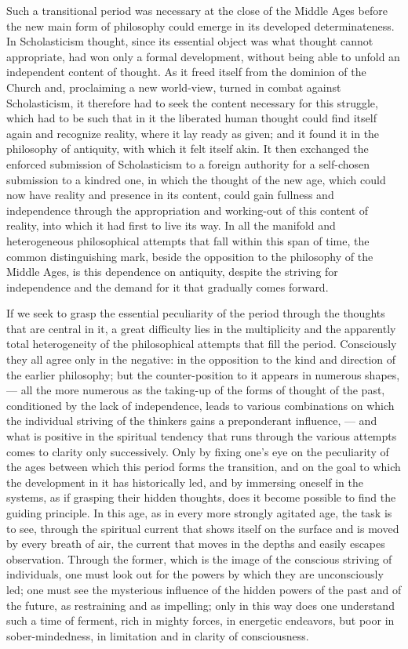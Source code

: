 Such a transitional period was necessary at the close of the Middle
Ages before the new main form of philosophy could emerge in its
developed determinateness. In Scholasticism thought, since its
essential object was what thought cannot appropriate, had won only a
formal development, without being able to unfold an independent
content of thought. As it freed itself from the dominion of the Church
and, proclaiming a new world-view, turned in combat against
Scholasticism, it therefore had to seek the content necessary for this
struggle, which had to be such that in it the liberated human thought
could find itself again and recognize reality, where it lay ready as
given; and it found it in the philosophy of antiquity, with which it
felt itself akin. It then exchanged the enforced submission of
Scholasticism to a foreign authority for a self-chosen submission to a
kindred one, in which the thought of the new age, which could now have
reality and presence in its content, could gain fullness and
independence through the appropriation and working-out of this content
of reality, into which it had first to live its way. In all
the manifold and heterogeneous philosophical attempts that fall within
this span of time, the common distinguishing mark, beside the
opposition to the philosophy of the Middle Ages, is this dependence on
antiquity, despite the striving for independence and the demand for it
that gradually comes forward.

If we seek to grasp the essential peculiarity of the period through
the thoughts that are central in it, a great difficulty lies in the
multiplicity and the apparently total heterogeneity of the
philosophical attempts that fill the period. Consciously they all
agree only in the negative: in the opposition to the kind and
direction of the earlier philosophy; but the counter-position to it
appears in numerous shapes, --- all the more numerous as the taking-up
of the forms of thought of the past, conditioned by the lack of
independence, leads to various combinations on which the individual
striving of the thinkers gains a preponderant influence, --- and what
is positive in the spiritual tendency that runs through the various
attempts comes to clarity only successively. Only by fixing one's eye
on the peculiarity of the ages between which this period forms the
transition, and on the goal to which the development in it has
historically led, and by immersing oneself in the systems, as if
grasping their hidden thoughts, does it become possible to find the
guiding principle. In this age, as in every more strongly agitated
age, the task is to see, through the spiritual current that shows
itself on the surface and is moved by every breath of air, the current
that moves in the depths and easily escapes observation. Through the
former, which is the image of the conscious striving of individuals,
one must look out for the powers by which they are unconsciously led;
one must see the mysterious influence of the hidden powers of the past
and of the future, as restraining and as impelling; only in this way
does one understand such a time of ferment, rich in mighty forces, in
energetic endeavors, but poor in sober-mindedness, in
limitation and in clarity of consciousness.

